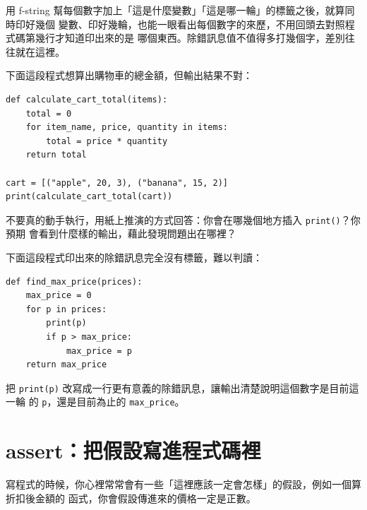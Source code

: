 用 f-string 幫每個數字加上「這是什麼變數」「這是哪一輪」的標籤之後，就算同時印好幾個
變數、印好幾輪，也能一眼看出每個數字的來歷，不用回頭去對照程式碼第幾行才知道印出來的是
哪個東西。除錯訊息值不值得多打幾個字，差別往往就在這裡。



\begin{drills}[label=drills:print-debug]
\item 下面這段程式想算出購物車的總金額，但輸出結果不對：
\begin{verbatim}
def calculate_cart_total(items):
    total = 0
    for item_name, price, quantity in items:
        total = price * quantity
    return total

cart = [("apple", 20, 3), ("banana", 15, 2)]
print(calculate_cart_total(cart))
\end{verbatim}
不要真的動手執行，用紙上推演的方式回答：你會在哪幾個地方插入 \texttt{print()}？你預期
會看到什麼樣的輸出，藉此發現問題出在哪裡？
\item 下面這段程式印出來的除錯訊息完全沒有標籤，難以判讀：
\begin{verbatim}
def find_max_price(prices):
    max_price = 0
    for p in prices:
        print(p)
        if p > max_price:
            max_price = p
    return max_price
\end{verbatim}
把 \texttt{print(p)} 改寫成一行更有意義的除錯訊息，讓輸出清楚說明這個數字是目前這一輪
的 \texttt{p}，還是目前為止的 \texttt{max\_price}。
\end{drills}

\section{assert：把假設寫進程式碼裡}
\label{sec:assert}

寫程式的時候，你心裡常常會有一些「這裡應該一定會怎樣」的假設，例如一個算折扣後金額的
函式，你會假設傳進來的價格一定是正數。

